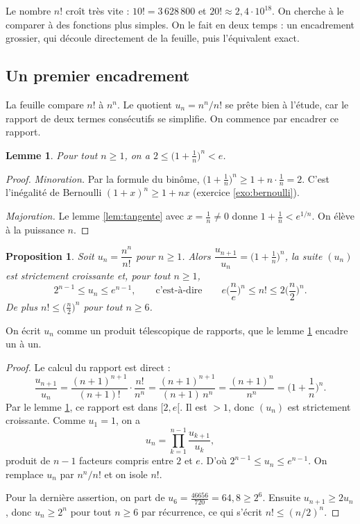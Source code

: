 \documentclass[11pt,a4paper]{article}
\theoremstyle{plain}
\newtheorem{proposition}[theoreme]{Proposition}
\newtheorem{lemme}[theoreme]{Lemme}
\theoremstyle{definition}
\theoremstyle{remark}
\begin{document}
Le nombre $n!$ croît très vite : $10!=3\,628\,800$ et $20!\approx2{,}4\cdot10^{18}$. On cherche à le comparer à des fonctions plus simples. On le fait en deux temps : un encadrement grossier, qui découle directement de la feuille, puis l'équivalent exact.

\subsection{Un premier encadrement}

La feuille compare $n!$ à $n^n$. Le quotient $u_n=n^n/n!$ se prête bien à l'étude, car le rapport de deux termes consécutifs se simplifie. On commence par encadrer ce rapport.

\begin{lemme}\label{lem:2e}
Pour tout $n\geq1$, on a $2\leq\big(1+\frac1n\big)^n<e$.
\end{lemme}

\begin{proof}
\emph{Minoration.} Par la formule du binôme, $\big(1+\frac1n\big)^n\geq1+n\cdot\frac1n=2$. C'est l'inégalité de Bernoulli $(1+x)^n\geq1+nx$ (exercice \ref{exo:bernoulli}).

\emph{Majoration.} Le lemme \ref{lem:tangente} avec $x=\frac1n\neq0$ donne $1+\frac1n<e^{1/n}$. On élève à la puissance $n$.
\end{proof}

\begin{proposition}\label{prop:encadrement}
Soit $u_n=\dfrac{n^n}{n!}$ pour $n\geq1$. Alors $\dfrac{u_{n+1}}{u_n}=\big(1+\frac1n\big)^n$, la suite $(u_n)$ est strictement croissante et, pour tout $n\geq1$,
\[
  2^{n-1}\leq u_n\leq e^{n-1},
  \qquad\text{c'est-à-dire}\qquad
  e\Big(\frac ne\Big)^n\leq n!\leq 2\Big(\frac n2\Big)^n .
\]
De plus $n!\leq\big(\frac n2\big)^n$ pour tout $n\geq6$.
\end{proposition}

On écrit $u_n$ comme un produit télescopique de rapports, que le lemme \ref{lem:2e} encadre un à un.

\begin{proof}
Le calcul du rapport est direct :
\[
  \frac{u_{n+1}}{u_n}=\frac{(n+1)^{n+1}}{(n+1)!}\cdot\frac{n!}{n^n}=\frac{(n+1)^{n+1}}{(n+1)\,n^n}=\frac{(n+1)^n}{n^n}=\Big(1+\frac1n\Big)^n .
\]
Par le lemme \ref{lem:2e}, ce rapport est dans $[2,e[$. Il est $>1$, donc $(u_n)$ est strictement croissante. Comme $u_1=1$, on a
\[
  u_n=\prod_{k=1}^{n-1}\frac{u_{k+1}}{u_k},
\]
produit de $n-1$ facteurs compris entre $2$ et $e$. D'où $2^{n-1}\leq u_n\leq e^{n-1}$. On remplace $u_n$ par $n^n/n!$ et on isole $n!$.

Pour la dernière assertion, on part de $u_6=\frac{46656}{720}=64{,}8\geq2^6$. Ensuite $u_{n+1}\geq2u_n$, donc $u_n\geq2^n$ pour tout $n\geq6$ par récurrence, ce qui s'écrit $n!\leq(n/2)^n$.
\end{proof}
\end{document}

